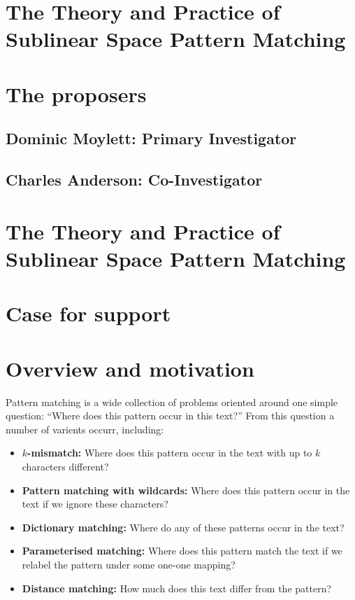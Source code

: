 \documentclass[a4paper,11pt]{article}
\begin{document}
    \section*{The Theory and Practice of Sublinear Space Pattern Matching}

    \section*{The proposers}

    \subsection*{Dominic Moylett: Primary Investigator}

    \subsection*{Charles Anderson: Co-Investigator}

    \newpage
    \section*{The Theory and Practice of Sublinear Space Pattern Matching}
    \section*{Case for support}

    \section{Overview and motivation}

    Pattern matching is a wide collection of problems oriented around one simple question: ``Where does this pattern occur in this text?'' From this question a number of varients occurr, including:

    \begin{itemize}
        \item \textbf{$k$-mismatch:} Where does this pattern occur in the text with up to $k$ characters different?
        \item \textbf{Pattern matching with wildcards:} Where does this pattern occur in the text if we ignore these characters?
        \item \textbf{Dictionary matching:} Where do any of these patterns occur in the text?
        \item \textbf{Parameterised matching:} Where does this pattern match the text if we relabel the pattern under some one-one mapping?
        \item \textbf{Distance matching:} How much does this text differ from the pattern?
    \end{itemize}
\end{document}
